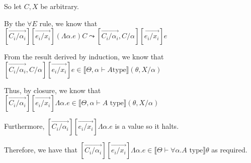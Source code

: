 \begin{enumerate}
    So let $C,X$ be arbitrary.

    By the $\forall E$ rule, we know that $[\overrightarrow{C_i / \alpha_i}][\overrightarrow{e_i / x_i}](\Lambda \alpha .e) C \leadsto [\overrightarrow{C_i / \alpha_i}, C / \alpha][\overrightarrow{e_i / x_i}]e$

    From the result derived by induction, we know that $[\overrightarrow{C_i / \alpha_i}, C / \alpha][\overrightarrow{e_i / x_i}]e \in \llbracket \Theta, \alpha \vdash A \text{type}\rrbracket(\theta, X / \alpha)$

    Thus, by closure, we know that $[\overrightarrow{C_i / \alpha_i}][\overrightarrow{e_i / x_i}] \Lambda \alpha. e \in \llbracket \Theta, \alpha \vdash A \text{ type}\rrbracket(\theta, X / \alpha)$

    Furthermore, $[\overrightarrow{C_i / \alpha_i}][\overrightarrow{e_i / x_i}]\Lambda \alpha .e$ is a value so it halts.

    Therefore, we have that $[\overrightarrow{C_i / \alpha_i}][\overrightarrow{e_i / x_i}] \Lambda \alpha.e \in \llbracket \Theta \vdash \forall \alpha. A \text{ type}\rrbracket \theta$ as required.



        
\end{enumerate}

